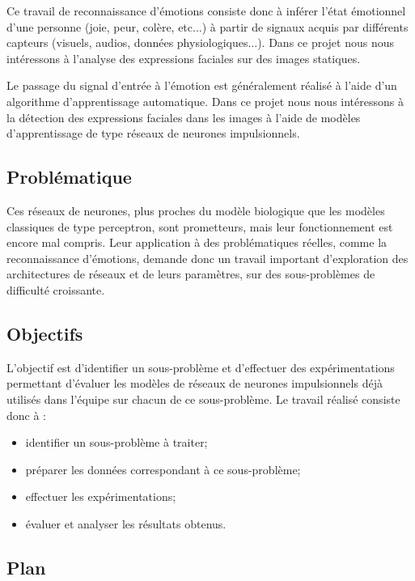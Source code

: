 \documentclass[12pt]{article}
\begin{document}
Ce travail de reconnaissance d'émotions consiste donc à inférer l'état émotionnel d'une personne (joie, peur, colère, etc...) à partir de signaux acquis par différents capteurs (visuels, audios, données physiologiques...). Dans ce projet nous nous intéressons à l'analyse des expressions faciales sur des images statiques.

Le passage du signal d'entrée à l'émotion est généralement réalisé à l'aide d'un algorithme d'apprentissage automatique. Dans ce projet nous nous intéressons à la détection des expressions faciales dans les images à l'aide de modèles d'apprentissage de type réseaux de neurones impulsionnels.

\subsection{Problématique}

Ces réseaux de neurones, plus proches du modèle biologique que les modèles classiques de type perceptron, sont prometteurs, mais leur fonctionnement est encore mal compris. Leur application à des problématiques réelles, comme la reconnaissance d'émotions, demande donc un travail important d'exploration des architectures de réseaux et de leurs paramètres, sur des sous-problèmes de difficulté croissante.

\subsection{Objectifs}

L'objectif est d'identifier un sous-problème et d'effectuer des expérimentations permettant d'évaluer les modèles de réseaux de neurones impulsionnels déjà utilisés dans l'équipe sur chacun de ce sous-problème. Le travail réalisé consiste donc à :

\begin{itemize}
\item identifier un sous-problème à traiter;
\item préparer les données correspondant à ce sous-problème;
\item effectuer les expérimentations;
\item évaluer et analyser les résultats obtenus.
\end{itemize}

\subsection{Plan}
\end{document}
